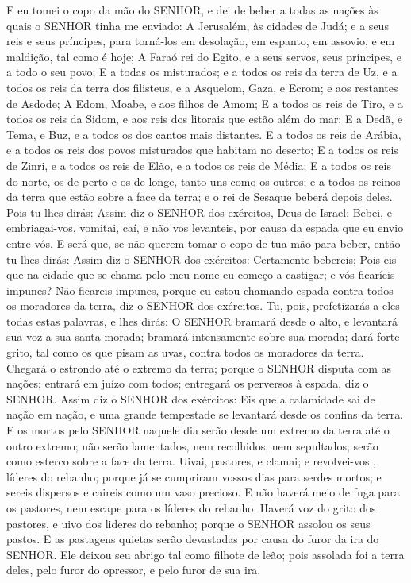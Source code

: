 {E eu tomei o copo da mão do SENHOR, e dei de beber a todas as nações às quais o SENHOR tinha me enviado:
A Jerusalém, às cidades de Judá; e a seus reis e seus príncipes, para torná-los em desolação, em espanto, em assovio, e em maldição, tal como é hoje;
A Faraó rei do Egito, e a seus servos, seus príncipes, e a todo o seu povo;
E a todas os
{} misturados; e a todos os reis da terra de Uz, e a todos os reis da terra dos filisteus, e a Asquelom, Gaza, e Ecrom; e aos restantes de Asdode;
A Edom, Moabe, e aos filhos de Amom;
E a todos os reis de Tiro, e a todos os reis da Sidom, e aos reis dos litorais que estão além do mar;
E a Dedã, e Tema, e Buz, e a todos os dos cantos mais distantes.
E a todos os reis de Arábia, e a todos os reis dos povos misturados que habitam no deserto;
E a todos os reis de Zinri, e a todos os reis de Elão, e a todos os reis de Média;
E a todos os reis do norte, os de perto e os de longe, tanto uns como os outros; e a todos os reinos da terra que estão sobre a face da terra; e o rei de Sesaque beberá depois deles.
Pois tu lhes dirás: Assim diz o SENHOR dos exércitos, Deus de Israel: Bebei, e embriagai-vos, vomitai, caí, e não vos levanteis, por causa da espada que eu envio entre vós.
E será que, se não querem tomar o copo de tua mão para beber, então tu lhes dirás: Assim diz o SENHOR dos exércitos: Certamente bebereis;
Pois eis que na cidade que se chama pelo meu nome eu começo a castigar; e vós ficaríeis impunes? Não ficareis impunes, porque eu estou chamando espada contra todos os moradores da terra, diz o SENHOR dos exércitos.
Tu, pois, profetizarás a eles todas estas palavras, e lhes dirás: O SENHOR bramará desde o alto, e levantará sua voz a sua santa morada; bramará intensamente sobre sua morada; dará forte grito, tal como os que pisam as uvas, contra todos os moradores da terra.
Chegará o estrondo até o extremo da terra; porque o SENHOR disputa com as nações; entrará em juízo com todos;
{} entregará os perversos à espada, diz o SENHOR.
Assim diz o SENHOR dos exércitos: Eis que a calamidade
 sai de nação em nação, e uma grande tempestade se levantará desde os confins da terra.
E os mortos pelo SENHOR naquele dia serão desde um extremo da terra até o outro extremo; não serão lamentados, nem recolhidos, nem sepultados; serão como esterco sobre a face da terra.
Uivai, pastores, e clamai; e revolvei-vos
{} , líderes do rebanho; porque já se cumpriram vossos dias para serdes mortos; e sereis dispersos e caireis como um vaso precioso.
E não haverá meio de fuga para os pastores, nem escape para os líderes do rebanho.
Haverá voz do grito dos pastores, e uivo dos lideres do rebanho; porque o SENHOR assolou os seus pastos.
E as pastagens quietas serão devastadas por causa do furor da ira do SENHOR.
Ele deixou seu abrigo tal como filhote de leão; pois assolada foi a terra deles, pelo furor do opressor, e pelo furor de sua ira.

}
